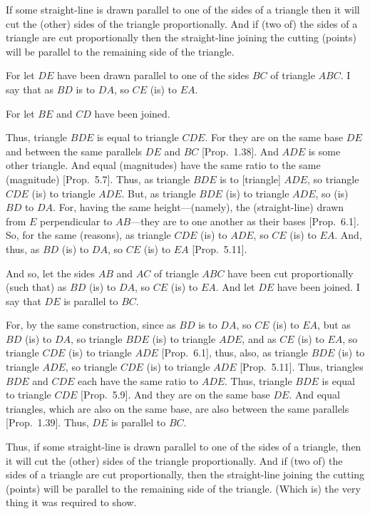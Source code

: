 If some straight-line is drawn parallel to one of the
sides of a triangle then it will cut the (other) sides of the triangle
proportionally. And if (two of) the sides of a triangle are cut proportionally then
the straight-line joining the cutting (points) will be parallel to the remaining side of the
triangle.

\epsfysize=2in
\centerline{}

For let $DE$ have been drawn parallel to one of the sides $BC$ of triangle $ABC$.
I say that as $BD$ is to $DA$, so $CE$ (is) to $EA$.

For let $BE$ and $CD$ have been joined.

Thus, triangle $BDE$ is equal to triangle $CDE$. For they are on the same
base $DE$ and between the same parallels $DE$ and $BC$  [Prop.~1.38].
And $ADE$ is some other triangle. And equal (magnitudes)
have the same ratio to the same (magnitude) [Prop.~5.7]. Thus, as triangle $BDE$ is to [triangle]
$ADE$, so triangle $CDE$ (is) to triangle $ADE$. But, as triangle $BDE$ (is) to
triangle $ADE$, so (is) $BD$ to $DA$. For, having the same height---(namely), the
(straight-line) drawn from $E$ perpendicular to $AB$---they are to one another as their bases
[Prop.~6.1].
So, for the same (reasons), as triangle $CDE$ (is) to $ADE$, so $CE$ (is) to $EA$.
And, thus, as $BD$ (is) to $DA$, so $CE$ (is) to $EA$ [Prop.~5.11].

And so, let the sides $AB$ and $AC$ of triangle $ABC$ have been cut proportionally (such that)
as $BD$ (is) to $DA$, so $CE$ (is) to $EA$. And let $DE$ have been joined. I say that
$DE$ is parallel to $BC$.

For, by the same construction, since as $BD$ is to $DA$, so $CE$ (is) to $EA$, but
as $BD$ (is) to $DA$, so triangle $BDE$ (is) to triangle $ADE$, and as $CE$
(is) to $EA$, so triangle $CDE$ (is) to triangle $ADE$ [Prop.~6.1], thus, also,  as triangle $BDE$ (is) to triangle
$ADE$, so triangle $CDE$ (is) to triangle $ADE$ [Prop.~5.11]. Thus, triangles $BDE$ and $CDE$ each have the same ratio to $ADE$. Thus, triangle $BDE$ is equal to triangle $CDE$ [Prop.~5.9].
And they are on the same base $DE$. And equal triangles, which are also on the same base, are also between the same parallels  [Prop.~1.39]. Thus,
$DE$ is parallel to $BC$.

Thus, if some straight-line is drawn parallel to one of the
sides of a triangle, then it will cut the (other) sides of the triangle
proportionally. And if (two of) the sides of a triangle are cut proportionally, then
the straight-line joining the cutting (points) will be parallel to the remaining side of the
triangle. (Which is) the very thing it was required to show.

